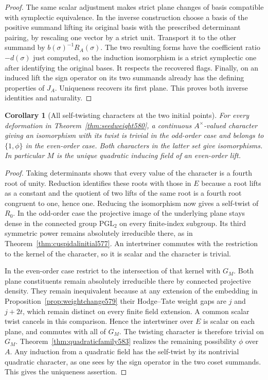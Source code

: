 \documentclass[a4paper,11pt]{article}
\newtheorem{corollary}[proposition]{Corollary}
\theoremstyle{definition}
\theoremstyle{remark}
\numberwithin{equation}{section}
\begin{document}
\begin{proof}
The same scalar adjustment makes strict plane changes of basis
compatible with symplectic equivalence. In the inverse construction
choose a basis of the positive summand lifting its original
basis with the prescribed determinant pairing, by rescaling
one vector by a strict unit. Transport it to the other summand
by \(b(\sigma)^{-1}R_A(\sigma)\). The two resulting forms have
the coefficient ratio \(-d(\sigma)\) just computed, so the
induction isomorphism is a strict symplectic one after identifying
the original bases. It respects the recovered flags. Finally, on
an induced lift the sign operator on its two summands already
has the defining properties of \(J_A\). Uniqueness recovers its
first plane. This proves both inverse identities and naturality.
\end{proof}

\begin{corollary}[All self-twisting characters at the two initial points]
\leavevmode\label{cor:allselftwists583}
For every deformation in Theorem~\ref{thm:seedweight580}, a
continuous \(A^\times\)-valued character giving an isomorphism
with its twist is trivial in the odd-order case and belongs
to \(\{1,\phi\}\) in the even-order case. Both characters in
the latter set give isomorphisms. In particular \(M\) is the
unique quadratic inducing field of an even-order lift.
\end{corollary}
\begin{proof}
Taking determinants shows that every value of the character
is a fourth root of unity. Reduction identifies these roots
with those in \(E\) because a root lifts as a constant and the
quotient of two lifts of the same root is a fourth root
congruent to one, hence one. Reducing the isomorphism now
gives a self-twist of \(R_0\). In the odd-order case the
projective image of the underlying plane stays dense in
the connected group \(\mathrm{PGL}_2\) on every finite-index
subgroup. Its third symmetric power remains absolutely
irreducible there, as in Theorem~\ref{thm:cuspidalinitial577}.
An intertwiner commutes with the restriction to the kernel
of the character, so it is scalar and the character is trivial.

In the even-order case restrict to the intersection of that
kernel with \(G_M\). Both plane constituents remain absolutely
irreducible there by connected projective density. They remain
inequivalent because at any extension of the embedding in
Proposition~\ref{prop:weightchange579} their Hodge--Tate weight
gaps are \(j\) and \(j+2t\), which remain distinct on every
finite field extension. A common scalar twist cancels in
this comparison. Hence the intertwiner over \(E\) is scalar
on each plane, and commutes with all of \(G_M\). The twisting
character is therefore trivial on \(G_M\).
Theorem~\ref{thm:quadraticfamily583} realizes the remaining possibility
\(\phi\) over \(A\). Any induction from a quadratic field has
the self-twist by its nontrivial quadratic character, as one
sees by the sign operator in the two coset summands. This gives
the uniqueness assertion.
\end{proof}
\end{document}
